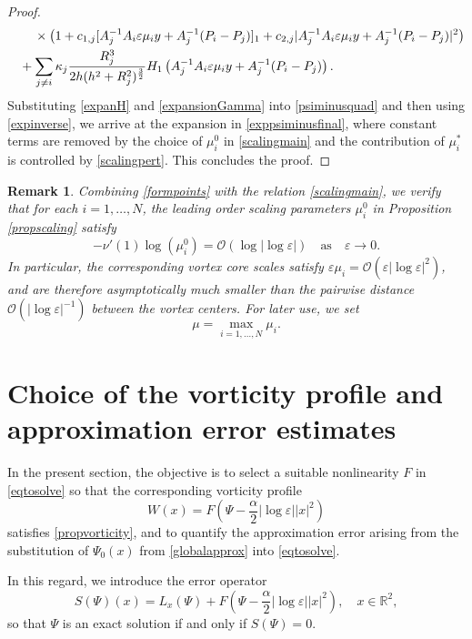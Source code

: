 \documentclass[11pt,reqno,a4paper]{amsart}
\numberwithin{equation}{section}
\newcommand{\R}{\mathbb{R}}
\newcommand{\ve}{\varepsilon}
\newtheorem{remark}{Remark}[section]
\begin{document}
\begin{proof}
\begin{equation}
\begin{aligned}
&\hspace{7mm}\times\left(1+c_{1,j}[A_j^{-1}A_i\ve\mu_iy+A_j^{-1}(P_i-P_j)]_1+c_{2,j}|A_j^{-1}A_i\ve\mu_iy+A_j^{-1}(P_i-P_j)|^2\right)\\
&\hspace{3mm}+\sum_{j \neq i}\kappa_j\frac{R_j^3}{2h(h^2+R_j^2)^{\frac 3 2}}H_1\left(A_j^{-1}A_i\ve\mu_i y +A_j^{-1}(P_i-P_j)\right).
\end{aligned}
\end{equation}
Substituting \eqref{expanH} and \eqref{expansionGamma} into \eqref{psiminusquad} and then using  \eqref{expinverse}, we arrive at the expansion in \eqref{exppsiminusfinal}, where constant terms are removed by the choice of $\mu_i^{0}$ in \eqref{scalingmain} and the contribution of $\mu_i^{*}$ is controlled by \eqref{scalingpert}. This concludes the proof.
\end{proof}
\begin{remark}
Combining \eqref{formpoints} with the relation \eqref{scalingmain}, we verify that for each $i=1,\dots,N$, the leading order scaling parameters $\mu_i^{0}$ in Proposition \ref{propscaling} satisfy
    \[-\nu'(1)\log(\mu_i^{0})=\mathcal{O}\left(\log|\log\ve|\right) \quad \mbox{as} \quad \ve \to 0.\]
    In particular, the corresponding vortex core scales satisfy $\ve \mu_i=\mathcal{O}(\ve|\log\ve|^2)$, and are therefore asymptotically much smaller than the pairwise distance $\mathcal{O}(|\log\ve|^{-1})$ between the vortex centers.
 For later use, we set 
 \begin{equation}\label{maxscaling}
     \mu=\max_{i=1,\dots,N}\mu_i.
 \end{equation}
\end{remark}
\section{Choice of the vorticity profile and approximation error estimates}\label{Section 5}
In the present section, the objective is to select a suitable nonlinearity $F$ in \eqref{eqtosolve} so that the corresponding vorticity profile \[W(x)=F\left(\Psi-\frac{\alpha}{2}|\log\ve||x|^2\right)\] satisfies \eqref{propvorticity}, and to quantify the approximation error arising from the substitution of $\Psi_0(x)$ from \eqref{globalapprox} into \eqref{eqtosolve}. 

In this regard, we introduce the error operator
\begin{equation}\label{definitionerroroper}
S(\Psi)(x)=L_{x}(\Psi)+F\left(\Psi-\frac{\alpha}{2}|\log\ve||x|^2\right), \quad x\in\R^2,
\end{equation}
so that $\Psi$ is an exact solution if and only if $S(\Psi)=0$.
\end{document}
